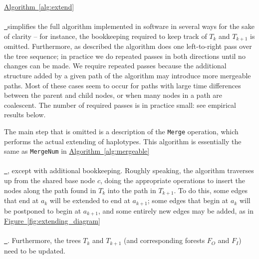 \documentclass[10pt,twoside,lineno]{gsajnl}
\newcommand{\tskit}{\texttt{tskit}}
\newcommand{\algorithmref}[2][]{%
	\hyperref[{#2}]{%
		Algorithm~\ref*{#2}%
		\ifx\\#1\\%
		\else
		\,#1%
		\fi
	}%
}
\newcommand*{\figref}[2][]{%
	\hyperref[{#2}]{%
		Figure~\ref*{#2}%
		\ifx\\#1\\%
		\else
		\,#1%
		\fi
	}%
}
\begin{document}
\algorithmref{alg:extend} simplifies the full algorithm implemented in software %
in several ways for the sake of clarity --
for instance, the bookkeeping required to keep track of $T_k$ and $T_{k+1}$ is omitted.
Furthermore, as described the algorithm does one left-to-right pass over the tree sequence;
in practice we do repeated passes in both directions until no changes can be made. 
We require repeated passes because the additional structure added by a given path of the algorithm
may introduce more mergeable paths.
Most of these cases seem to occur for paths
with large time differences between the parent and child nodes,
or when many nodes in a path are coalescent. 
The number of required passes is in practice small:
see empirical results below.

The main step that is omitted is a description of the \texttt{Merge} operation,
which performs the actual extending of haplotypes.
This algorithm is essentially the same as \texttt{MergeNum} in \algorithmref{alg:mergeable},
except with additional bookkeeping.
Roughly speaking, the algorithm
traverses up from the shared base node $c$,
doing the appropriate operations to insert the nodes along the path found in $T_k$
into the path in $T_{k+1}$.
To do this, some edges that end at $a_k$ will be extended to end at $a_{k+1}$;
some edges that begin at $a_k$ will be postponed to begin at $a_{k+1}$,
and some entirely new edges may be added, as in \figref{fig:extending_diagram}.
Furthermore, the trees $T_k$ and $T_{k+1}$ (and corresponding forests $F_O$ and $F_I$)
need to be updated.
\end{document}

